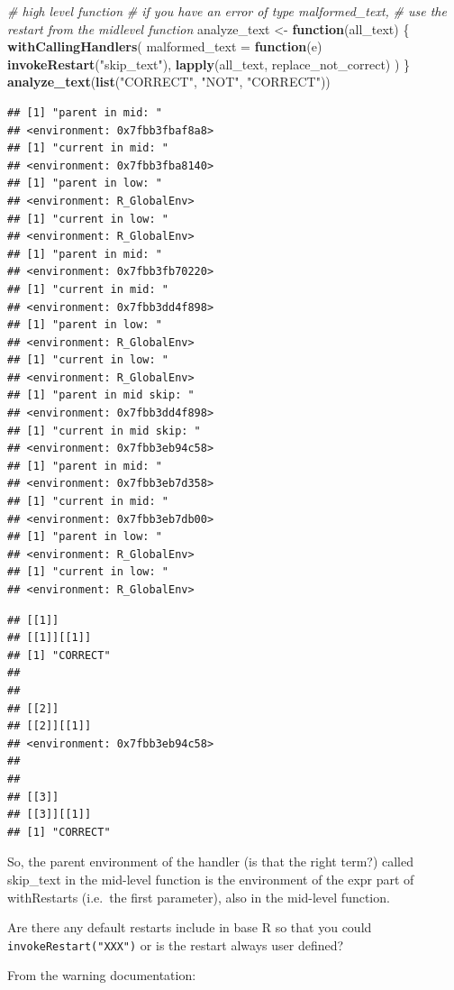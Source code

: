 \documentclass[]{book}
\newenvironment{Shaded}{\begin{snugshade}}{\end{snugshade}}
\newcommand{\CommentTok}[1]{\textcolor[rgb]{0.56,0.35,0.01}{\textit{#1}}}
\newcommand{\ControlFlowTok}[1]{\textcolor[rgb]{0.13,0.29,0.53}{\textbf{#1}}}
\newcommand{\DataTypeTok}[1]{\textcolor[rgb]{0.13,0.29,0.53}{#1}}
\newcommand{\KeywordTok}[1]{\textcolor[rgb]{0.13,0.29,0.53}{\textbf{#1}}}
\newcommand{\NormalTok}[1]{#1}
\newcommand{\StringTok}[1]{\textcolor[rgb]{0.31,0.60,0.02}{#1}}
\begin{document}
\begin{Shaded}
\begin{Highlighting}[]
\CommentTok{# high level function}
\CommentTok{# if you have an error of type malformed_text, }
\CommentTok{# use the restart from the midlevel function}
\NormalTok{analyze_text <-}\StringTok{ }\ControlFlowTok{function}\NormalTok{(all_text) \{}
  \KeywordTok{withCallingHandlers}\NormalTok{(}
    \DataTypeTok{malformed_text =} \ControlFlowTok{function}\NormalTok{(e) }\KeywordTok{invokeRestart}\NormalTok{(}\StringTok{"skip_text"}\NormalTok{),}
    \KeywordTok{lapply}\NormalTok{(all_text, replace_not_correct)}
\NormalTok{  )}
\NormalTok{\}}
\KeywordTok{analyze_text}\NormalTok{(}\KeywordTok{list}\NormalTok{(}\StringTok{"CORRECT"}\NormalTok{, }\StringTok{"NOT"}\NormalTok{, }\StringTok{"CORRECT"}\NormalTok{))}
\end{Highlighting}
\end{Shaded}

\begin{verbatim}
## [1] "parent in mid: "
## <environment: 0x7fbb3fbaf8a8>
## [1] "current in mid: "
## <environment: 0x7fbb3fba8140>
## [1] "parent in low: "
## <environment: R_GlobalEnv>
## [1] "current in low: "
## <environment: R_GlobalEnv>
## [1] "parent in mid: "
## <environment: 0x7fbb3fb70220>
## [1] "current in mid: "
## <environment: 0x7fbb3dd4f898>
## [1] "parent in low: "
## <environment: R_GlobalEnv>
## [1] "current in low: "
## <environment: R_GlobalEnv>
## [1] "parent in mid skip: "
## <environment: 0x7fbb3dd4f898>
## [1] "current in mid skip: "
## <environment: 0x7fbb3eb94c58>
## [1] "parent in mid: "
## <environment: 0x7fbb3eb7d358>
## [1] "current in mid: "
## <environment: 0x7fbb3eb7db00>
## [1] "parent in low: "
## <environment: R_GlobalEnv>
## [1] "current in low: "
## <environment: R_GlobalEnv>
\end{verbatim}

\begin{verbatim}
## [[1]]
## [[1]][[1]]
## [1] "CORRECT"
## 
## 
## [[2]]
## [[2]][[1]]
## <environment: 0x7fbb3eb94c58>
## 
## 
## [[3]]
## [[3]][[1]]
## [1] "CORRECT"
\end{verbatim}

So, the parent environment of the handler (is that the right term?) called skip\_text in the mid-level function is the environment of the expr part of withRestarts (i.e.~the first parameter), also in the mid-level function.

Are there any default restarts include in base R so that you could \texttt{invokeRestart("XXX")} or is the restart always user defined?

From the warning documentation:
\end{document}
